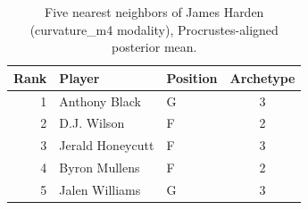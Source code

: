 \begin{table}[htbp]
  \centering\small
  \begin{tabular}{rllc}
    \toprule
    Rank & Player & Position & Archetype \\
    \midrule
    1 & Anthony Black & G & 3 \\
    2 & D.J. Wilson & F & 2 \\
    3 & Jerald Honeycutt & F & 3 \\
    4 & Byron Mullens & F & 2 \\
    5 & Jalen Williams & G & 3 \\
    \bottomrule
  \end{tabular}
  \caption{Five nearest neighbors of James Harden (curvature_m4 modality), Procrustes-aligned posterior mean.}
  \label{tab:James_Harden_neighbors_curvature_m4}
\end{table}

